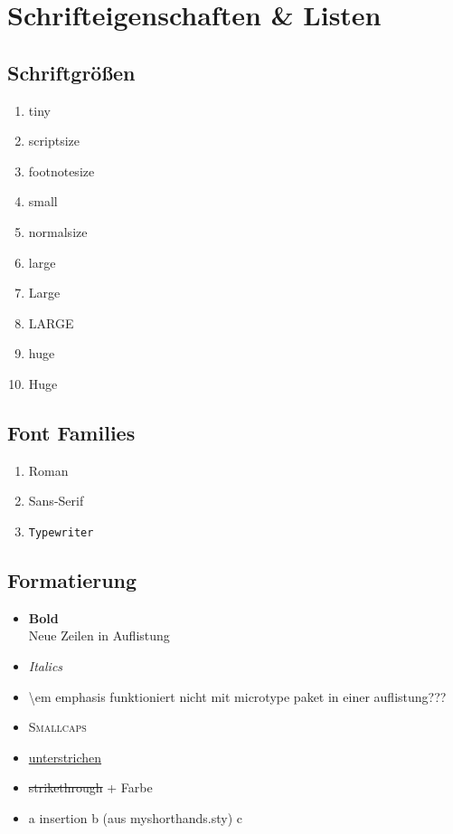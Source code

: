\section{Schrifteigenschaften \& Listen}

\subsection{Schriftgrößen}

\begin{enumerate}
	\item {\tiny tiny}
	\item {\scriptsize scriptsize}
	\item {\footnotesize footnotesize}
	\item {\small small}
	\item {\normalsize normalsize}
	\item {\large large}
	\item {\Large Large}
	\item {\LARGE LARGE}
	\item {\huge huge}
	\item {\Huge Huge}
\end{enumerate}

\subsection{Font Families}

\begin{enumerate}
	\item[C)] \textrm{Roman}
	\item[A)] \textsf{Sans-Serif}
	\item[B)] \texttt{Typewriter}
\end{enumerate}

\subsection{Formatierung}

\begin{itemize}
	\item \textbf{Bold} \\ Neue Zeilen in Auflistung
	\item \textit{Italics}
	\item \textbackslash em emphasis funktioniert nicht mit microtype paket in einer auflistung??? %
	\item \textsc{Smallcaps}
	\item \underline{unterstrichen}
	\item {\color{red} \sout{strikethrough}  + Farbe}
	\item {} a {\ins insertion} b {\aside (aus myshorthands.sty)} c
\end{itemize}

